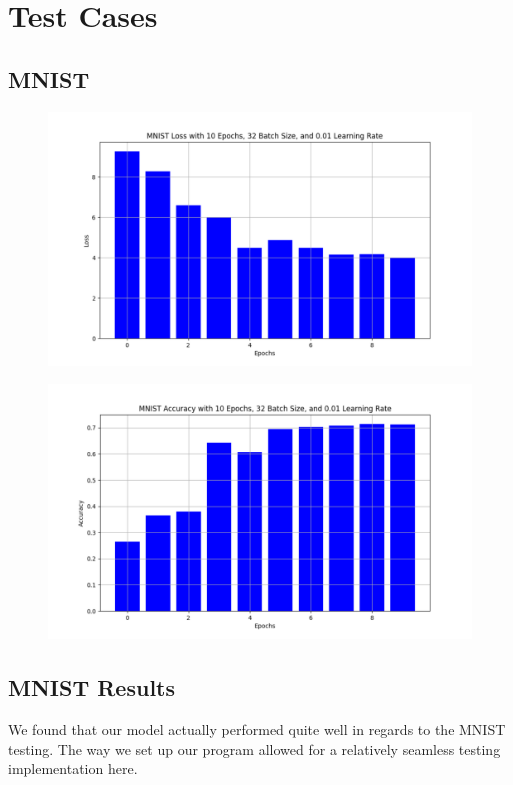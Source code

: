 \documentclass{article}
\begin{document}
\section{Test Cases}
\subsection{MNIST}


\begin{figure}[!h]
    \centering
    \includegraphics[width=0.75\linewidth]{figs/MNIST L 10-32-0.01.png}
\end{figure}

\begin{figure}[!h]
    \centering
    \includegraphics[width=0.75\linewidth]{figs/MNST A 10-32-0.01.png}
\end{figure}

\subsection{MNIST Results}

We found that our model actually performed quite well in regards to the MNIST testing. The way we set up our program allowed for a relatively seamless testing implementation here.
\end{document}
